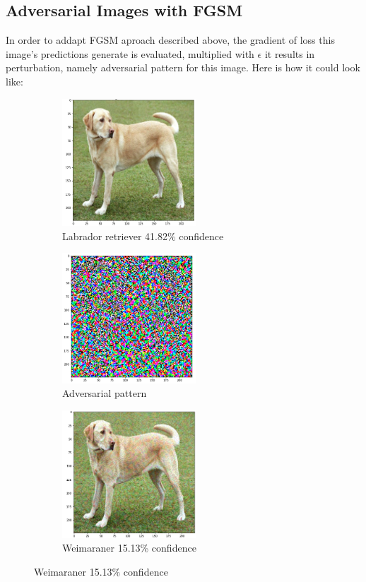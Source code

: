 \subsection{Adversarial Images with FGSM}
In order to addapt FGSM aproach described above, the gradient of loss this image's predictions generate is evaluated, multiplied with $\epsilon$ it results in perturbation, namely adversarial pattern for this image. Here is how it could look like:
\begin{figure}[!h]
    \begin{subfigure}{0.33\textwidth}
        \caption{Labrador retriever 41.82\% confidence}
        \includegraphics[width=5cm]{images/labrador.png}
    \end{subfigure}
    \begin{subfigure}{0.33\textwidth}
        \caption{Adversarial pattern}
        \includegraphics[width=5cm]{images/adv_pattern.png}
    \end{subfigure}
    \begin{subfigure}{0.3\textwidth}
        \caption{Weimaraner 15.13\% confidence}
        \includegraphics[width=5cm]{images/adv_labrador.png}
    \end{subfigure}
\end{figure}

